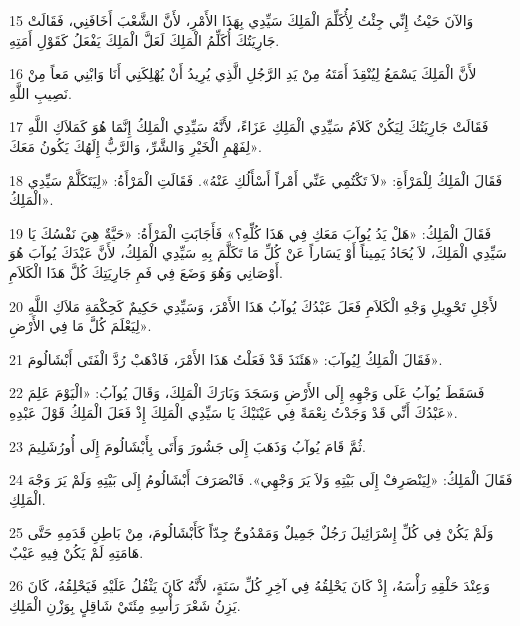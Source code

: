 \par 15 وَالآنَ حَيْثُ إِنِّي جِئْتُ لِأُكَلِّمَ الْمَلِكَ سَيِّدِي بِهَذَا الأَمْرِ، لأَنَّ الشَّعْبَ أَخَافَنِي، فَقَالَتْ جَارِيَتُكَ أُكَلِّمُ الْمَلِكَ لَعَلَّ الْمَلِكَ يَفْعَلُ كَقَوْلِ أَمَتِهِ.
\par 16 لأَنَّ الْمَلِكَ يَسْمَعُ لِيُنْقِذَ أَمَتَهُ مِنْ يَدِ الرَّجُلِ الَّذِي يُرِيدُ أَنْ يُهْلِكَنِي أَنَا وَابْنِي مَعاً مِنْ نَصِيبِ اللَّهِ.
\par 17 فَقَالَتْ جَارِيَتُكَ لِيَكُنْ كَلاَمُ سَيِّدِي الْمَلِكِ عَزَاءً، لأَنَّهُ سَيِّدِي الْمَلِكُ إِنَّمَا هُوَ كَمَلاَكِ اللَّهِ لِفَهْمِ الْخَيْرِ وَالشَّرِّ، وَالرَّبُّ إِلَهُكَ يَكُونُ مَعَكَ».
\par 18 فَقَالَ الْمَلِكُ لِلْمَرْأَةِ: «لاَ تَكْتُمِي عَنِّي أَمْراً أَسْأَلُكِ عَنْهُ». فَقَالَتِ الْمَرْأَةُ: «لِيَتَكَلَّمْ سَيِّدِي الْمَلِكُ».
\par 19 فَقَالَ الْمَلِكُ: «هَلْ يَدُ يُوآبَ مَعَكِ فِي هَذَا كُلِّهِ؟» فَأَجَابَتِ الْمَرْأَةُ: «حَيَّةٌ هِيَ نَفْسُكَ يَا سَيِّدِي الْمَلِكَ، لاَ يُحَادُ يَمِيناً أَوْ يَسَاراً عَنْ كُلِّ مَا تَكَلَّمَ بِهِ سَيِّدِي الْمَلِكُ، لأَنَّ عَبْدَكَ يُوآبَ هُوَ أَوْصَانِي وَهُوَ وَضَعَ فِي فَمِ جَارِيَتِكَ كُلَّ هَذَا الْكَلاَمِ.
\par 20 لأَجْلِ تَحْوِيلِ وَجْهِ الْكَلاَمِ فَعَلَ عَبْدُكَ يُوآبُ هَذَا الأَمْرَ، وَسَيِّدِي حَكِيمٌ كَحِكْمَةِ مَلاَكِ اللَّهِ لِيَعْلَمَ كُلَّ مَا فِي الأَرْضِ».
\par 21 فَقَالَ الْمَلِكُ لِيُوآبَ: «هَئَنَذَ قَدْ فَعَلْتُ هَذَا الأَمْرَ، فَاذْهَبْ رُدَّ الْفَتَى أَبْشَالُومَ».
\par 22 فَسَقَطَ يُوآبُ عَلَى وَجْهِهِ إِلَى الأَرْضِ وَسَجَدَ وَبَارَكَ الْمَلِكَ، وَقَالَ يُوآبُ: «الْيَوْمَ عَلِمَ عَبْدُكَ أَنِّي قَدْ وَجَدْتُ نِعْمَةً فِي عَيْنَيْكَ يَا سَيِّدِي الْمَلِكَ إِذْ فَعَلَ الْمَلِكُ قَوْلَ عَبْدِهِ».
\par 23 ثُمَّ قَامَ يُوآبُ وَذَهَبَ إِلَى جَشُورَ وَأَتَى بِأَبْشَالُومَ إِلَى أُورُشَلِيمَ.
\par 24 فَقَالَ الْمَلِكُ: «لِيَنْصَرِفْ إِلَى بَيْتِهِ وَلاَ يَرَ وَجْهِي». فَانْصَرَفَ أَبْشَالُومُ إِلَى بَيْتِهِ وَلَمْ يَرَ وَجْهَ الْمَلِكِ.
\par 25 وَلَمْ يَكُنْ فِي كُلِّ إِسْرَائِيلَ رَجُلٌ جَمِيلٌ وَمَمْدُوحٌ جِدّاً كَأَبْشَالُومَ، مِنْ بَاطِنِ قَدَمِهِ حَتَّى هَامَتِهِ لَمْ يَكُنْ فِيهِ عَيْبٌ.
\par 26 وَعِنْدَ حَلْقِهِ رَأْسَهُ، إِذْ كَانَ يَحْلِقُهُ فِي آخِرِ كُلِّ سَنَةٍ، لأَنَّهُ كَانَ يَثْقُلُ عَلَيْهِ فَيَحْلِقُهُ، كَانَ يَزِنُ شَعْرَ رَأْسِهِ مِئَتَيْ شَاقِلٍ بِوَزْنِ الْمَلِكِ.
